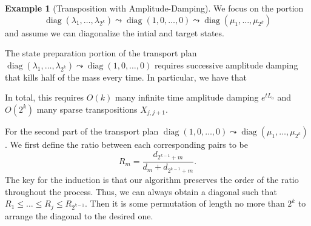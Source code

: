 \documentclass[11pt,reqno]{amsart}
\theoremstyle{definition}
\newtheorem{example}[theorem]{Example}
\DeclareMathOperator{\diag}{diag}
\begin{document}
\begin{example}[Transposition with Amplitude-Damping]
    We focus on the portion 
    $$\diag(\lambda_1,\dots, \lambda_{2^k})\leadsto \diag(1,0,\dots, 0)\leadsto\diag(\mu_1,\dots, \mu_{2^k})$$
    and assume we can diagonalize the intial and target states.

    The state preparation portion of the transport plan $\diag(\lambda_1,\dots, \lambda_{2^k})\leadsto \diag(1,0,\dots, 0)$ requires successive amplitude damping that kills half of the mass every time. In particular, we have that 
    \begin{center}
    \end{center}
    In total, this requires $O(k)$ many infinite time amplitude damping $e^{tL_a}$ and $O(2^{k})$ many sparse transpositions $X_{j, j+1}$.


    For the second part of the transport plan $\diag(1,0,\dots, 0)\leadsto\diag(\mu_1,\dots, \mu_{2^k})$. We first define the ratio between each corresponding pairs to be $$R_m=\frac{d_{2^{k-1}+m}}{d_{m}+d_{2^{k-1}+m}}.$$ The key for the induction is that our algorithm preserves the order of the ratio throughout the process. Thus, we can always obtain a diagonal such that $R_1\leq\dots\leq R_j\leq R_{2^{k-1}}$. Then it is some permutation of length no more than $2^k$ to arrange the diagonal to the desired one.
    

\end{example}
\end{document}
